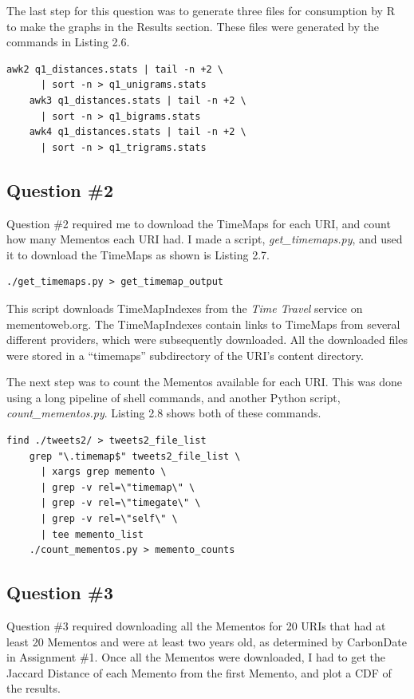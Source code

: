 \documentclass[a4paper,12pt]{article}
\begin{document}
The last step for this question was to generate three files for consumption by R to make the graphs in the
Results section. These files were generated by the commands in Listing 2.6.

\begin{lstlisting}[basicstyle=\ttfamily,caption={Generating R Input Files}]
    awk2 q1_distances.stats | tail -n +2 \
      | sort -n > q1_unigrams.stats
    awk3 q1_distances.stats | tail -n +2 \
      | sort -n > q1_bigrams.stats
    awk4 q1_distances.stats | tail -n +2 \
      | sort -n > q1_trigrams.stats
\end{lstlisting}

\subsection{Question \#2}
Question \#2 required me to download the TimeMaps for each URI, and count how many Mementos each URI had.
I made a script, \emph{get\_timemaps.py}, and used it to download the TimeMaps as shown is Listing 2.7.

\begin{lstlisting}[basicstyle=\ttfamily,caption={Downloading TimeMaps}]
    ./get_timemaps.py > get_timemap_output
\end{lstlisting}

This script downloads TimeMapIndexes from the \emph{Time Travel} service on mementoweb.org. The
TimeMapIndexes contain links to TimeMaps from several different providers, which were subsequently
downloaded. All the downloaded files were stored in a ``timemaps'' subdirectory of the URI's content
directory.

The next step was to count the Mementos available for each URI. This was done using a long pipeline of
shell commands, and another Python script, \emph{count\_mementos.py}. Listing 2.8 shows both of these
commands.

\begin{lstlisting}[basicstyle=\ttfamily,caption={Counting Mementos}]
    find ./tweets2/ > tweets2_file_list
    grep "\.timemap$" tweets2_file_list \
      | xargs grep memento \
      | grep -v rel=\"timemap\" \
      | grep -v rel=\"timegate\" \
      | grep -v rel=\"self\" \
      | tee memento_list
    ./count_mementos.py > memento_counts
\end{lstlisting}

\subsection{Question \#3}
Question \#3 required downloading all the Mementos for 20 URIs that had at least 20 Mementos and were at
least two years old, as determined by CarbonDate in Assignment \#1. Once all the Mementos were downloaded,
I had to get the Jaccard Distance of each Memento from the first Memento, and plot a CDF of the results.
\end{document}
